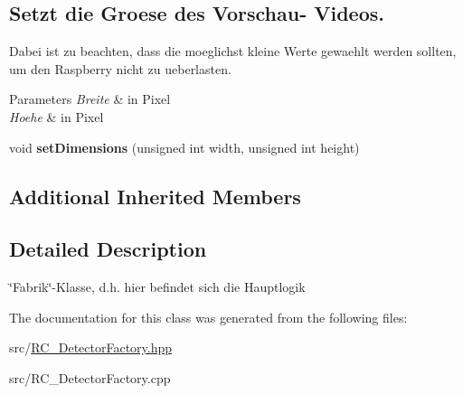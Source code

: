 \subsection*{Setzt die Groese des Vorschau-\/ Videos.}
\label{_amgrp31fff75453dbcfb0cbda6f83097f2790}%
Dabei ist zu beachten, dass die moeglichst kleine Werte gewaehlt werden sollten, um den Raspberry nicht zu ueberlasten.


\begin{DoxyParams}{Parameters}
{\em Breite} & in Pixel \\
\hline
{\em Hoehe} & in Pixel \\
\hline
\end{DoxyParams}
\begin{DoxyCompactItemize}
\item 
\hypertarget{classrc_1_1DetectorFactory_af409e6e3ee0d2cfea590b93bfa6e88de}{void {\bfseries set\+Dimensions} (unsigned int width, unsigned int height)}\label{classrc_1_1DetectorFactory_af409e6e3ee0d2cfea590b93bfa6e88de}

\end{DoxyCompactItemize}
\subsection*{Additional Inherited Members}


\subsection{Detailed Description}
\char`\"{}\+Fabrik\char`\"{}-\/\+Klasse, d.\+h. hier befindet sich die Hauptlogik 

The documentation for this class was generated from the following files\+:\begin{DoxyCompactItemize}
\item 
src/\hyperlink{RC__DetectorFactory_8hpp}{R\+C\+\_\+\+Detector\+Factory.\+hpp}\item 
src/R\+C\+\_\+\+Detector\+Factory.\+cpp\end{DoxyCompactItemize}
